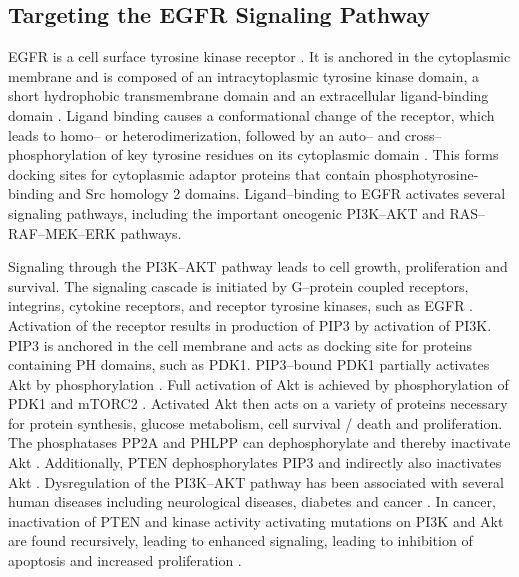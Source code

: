 {{{  \subsection{Targeting the EGFR Signaling Pathway}

    EGFR is a cell surface tyrosine kinase receptor {\cite{egfr_review}}. It
    is anchored in the cytoplasmic membrane and is composed of an
    intracytoplasmic tyrosine kinase domain, a short hydrophobic transmembrane
    domain and an extracellular ligand-binding domain {\cite{egfr_review_2}}.
    Ligand binding causes a conformational change of the receptor, which leads
    to homo-- or heterodimerization, followed by an auto-- and
    cross--phosphorylation of key tyrosine residues on its cytoplasmic domain
    {\cite{egfr_review_2}}. This forms docking sites for cytoplasmic adaptor
    proteins that contain phosphotyrosine-binding and Src homology 2 domains.
    Ligand--binding to EGFR activates several signaling pathways, including the
    important oncogenic PI3K--AKT and RAS--RAF--MEK--ERK pathways.

    Signaling through the PI3K--AKT pathway leads to cell growth, proliferation
    and survival. The signaling cascade is initiated by G--protein coupled receptors, integrins, cytokine
    receptors, and receptor tyrosine kinases, such
    as EGFR {\cite{pi3k_2}}. Activation of the receptor results in production of
    PIP3 by activation of PI3K. PIP3 is anchored in the cell membrane and acts
    as docking site for proteins containing PH domains, such as PDK1.
    PIP3--bound PDK1 partially activates Akt by phosphorylation {\cite{pi3k_3}}.
    Full activation of Akt is achieved by phosphorylation of PDK1 and mTORC2
    {\cite{pdk1}}. Activated Akt then acts on a variety of proteins necessary
    for protein synthesis, glucose metabolism, cell survival / death and
    proliferation. The phosphatases PP2A and PHLPP can dephosphorylate and
    thereby inactivate Akt {\cite{pdk1}}. Additionally, PTEN dephosphorylates
    PIP3 and indirectly also inactivates Akt {\cite{pdk1}}. Dysregulation of the
    PI3K--AKT pathway has been associated with several human diseases including
    neurological diseases, diabetes and cancer {\cite{akt}}. In cancer,
    inactivation of PTEN and kinase activity activating mutations on PI3K and
    Akt are found recursively, leading to enhanced signaling, leading to
    inhibition of apoptosis and increased proliferation {\cite{pi3k}}.

}}}
